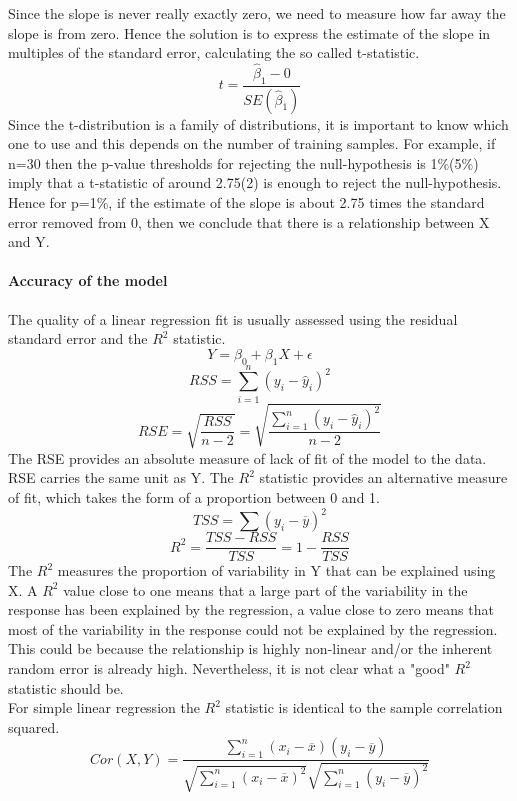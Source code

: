 \documentclass[../document.tex]{subfiles}
\begin{document}
	Since the slope is never really exactly zero, we need to measure how far away the slope is from zero. Hence the solution is to express the estimate of the slope in multiples of the standard error, calculating the so called t-statistic.
	\begin{equation}
		t = \frac{\hat{\beta}_{1}-0}{SE(\hat{\beta}_{1})}
	\end{equation}
	Since the t-distribution is a family of distributions, it is important to know which one to use and this depends on the number of training samples.
	For example, if n=30 then the p-value thresholds for rejecting the null-hypothesis is 1\%(5\%) imply that a t-statistic of around 2.75(2) is enough to reject the null-hypothesis.\\
	Hence for p=1\%, if the estimate of the slope is about 2.75 times the standard error removed from 0, then we conclude that there is a relationship between X and Y.

	\paragraph{Accuracy of the model}
	The quality of a linear regression fit is usually assessed using the residual standard error and the \(R^2\) statistic.
	\begin{equation}
		Y = \beta_{0} + \beta_{1}X + \epsilon
	\end{equation}
	\begin{equation}
		RSS = \sum_{i=1}^{n}(y_{i}-\hat{y}_{i})^2
	\end{equation}
	\begin{equation}
		RSE = \sqrt{\frac{RSS}{n-2}} = \sqrt{\frac{\sum_{i=1}^{n}(y_{i}-\hat{y}_{i})^2}{n-2}}
	\end{equation}
	The RSE provides an absolute measure of lack of fit of the model to the data. RSE carries the same unit as Y. The \(R^2\) statistic provides an alternative measure of fit, which takes the form of a proportion between 0 and 1.
	\begin{equation}
		TSS = \sum(y_{i}-\overline{y})^2
	\end{equation}
	\begin{equation}
		R^2 = \frac{TSS - RSS}{TSS} = 1-\frac{RSS}{TSS}
	\end{equation}
	The \(R^2\) measures the proportion of variability in Y that can be explained using X. A \(R^2\) value close to one means that a large part of the variability in the response has been explained by the regression, a value close to zero means that most of the variability in the response could not be explained by the regression. This could be because the relationship is highly non-linear and/or the inherent random error is already high. Nevertheless, it is not clear what a "good" \(R^2\) statistic should be.\\
	For simple linear regression the \(R^2\) statistic is identical to the sample correlation squared.
	\begin{equation}
		Cor(X,Y)=\frac{\sum_{i=1}^{n}(x_{i}-\overline{x})(y_{i}-\overline{y})}{\sqrt{\sum_{i=1}^{n}(x_{i}-\overline{x})^2}\sqrt{\sum_{i=1}^{n}(y_{i}-\overline{y})^2}}
	\end{equation}
\end{document}
